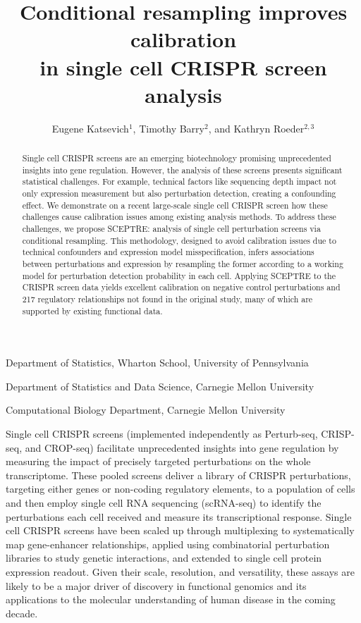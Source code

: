 \documentclass{nature}
\title{Conditional resampling improves calibration \\ in single cell CRISPR screen analysis}
\author{Eugene Katsevich$^{1}$, Timothy Barry$^{2}$, and Kathryn Roeder$^{2,3}$}
\begin{document}
\maketitle

\addtocounter{page}{-1}
\thispagestyle{empty}

\begin{affiliations}
 \item Department of Statistics, Wharton School, University of Pennsylvania
 \item Department of Statistics and Data Science, Carnegie Mellon University
 \item Computational Biology Department, Carnegie Mellon University
\end{affiliations}


\begin{abstract}
Single cell CRISPR screens are an emerging biotechnology promising unprecedented insights into gene regulation. However, the analysis of these screens presents significant statistical challenges. For example, technical factors like sequencing depth impact not only expression measurement but also perturbation detection, creating a confounding effect. We demonstrate on a recent large-scale single cell CRISPR screen how these challenges cause calibration issues among existing analysis methods. To address these challenges, we propose SCEPTRE: analysis of single cell perturbation screens via conditional resampling. This methodology, designed to avoid calibration issues due to technical confounders and expression model misspecification, infers associations between perturbations and expression by resampling the former according to a working model for perturbation detection probability in each cell. Applying SCEPTRE to the CRISPR screen data yields excellent calibration on negative control perturbations and 217 regulatory relationships not found in the original study, many of which are supported by existing functional data.
\end{abstract}

\clearpage

Single cell CRISPR screens (implemented independently as Perturb-seq\cite{Dixit2016, Adamson2016}, CRISP-seq\cite{Jaitin2016}, and CROP-seq\cite{Datlinger2017}) facilitate unprecedented insights into gene regulation by measuring the impact of precisely targeted perturbations on the whole transcriptome. These pooled screens deliver a library of CRISPR perturbations, targeting either genes or non-coding regulatory elements, to a population of cells and then employ single cell RNA sequencing (scRNA-seq) to identify the perturbations each cell received and measure its transcriptional response. Single cell CRISPR screens have been scaled up through multiplexing to systematically map gene-enhancer relationships\cite{Xie2017,Gasperini2019,Xie2019}, applied using combinatorial perturbation libraries to study genetic interactions\cite{Norman2019}, and extended to single cell protein expression readout\cite{Mimitou2019,Frangieh2020}. Given their scale, resolution, and versatility, these assays are likely to be a major driver of discovery in functional genomics and its applications to the molecular understanding of human disease in the coming decade\cite{Gasperini2020}. 
\end{document}

